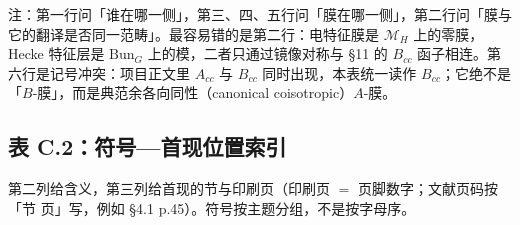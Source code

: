 注：第一行问「谁在哪一侧」，第三、四、五行问「膜在哪一侧」，第二行问「膜与它的翻译是否同一范畴」。最容易错的是第二行：电特征膜是 $\mathcal M_H$ 上的零膜，Hecke 特征层是 $\mathrm{Bun}_G$ 上的模，二者只通过镜像对称与 \S11 的 $B_{cc}$ 函子相连。第六行是记号冲突：项目正文里 $A_{cc}$ 与 $B_{cc}$ 同时出现，本表统一读作 $B_{cc}$；它绝不是「$B$-膜」，而是典范余各向同性（canonical coisotropic）$A$-膜。

\subsection{表 C.2：符号—首现位置索引}

第二列给含义，第三列给首现的节与印刷页（印刷页 $=$ 页脚数字；文献页码按「节 页」写，例如 \S4.1 p.45）。符号按主题分组，不是按字母序。

\begingroup
\footnotesize
\renewcommand{\arraystretch}{1.14}
